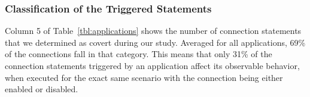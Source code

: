 

\subsubsection{Classification of the Triggered Statements}
Column 5 of Table~\ref{tbl:applications} shows the number of connection statements that we determined as covert during our study. 
Averaged for all applications, 69\% of the connections fall in that category. 
This means that only 31\% of the connection statements triggered by an application affect its observable behavior, 
when executed for the exact same scenario with the connection being either enabled or disabled.



